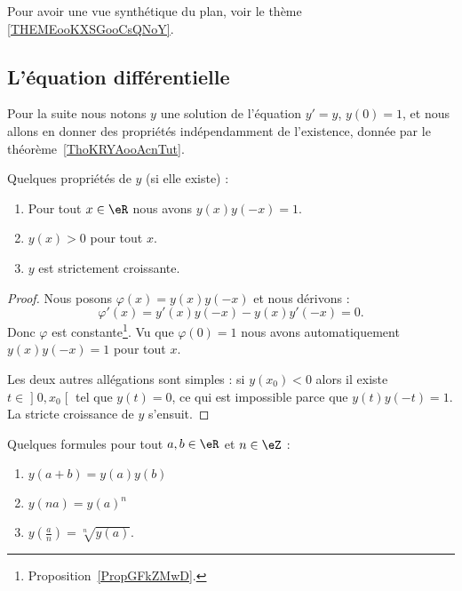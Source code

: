 Pour avoir une vue synthétique du plan, voir le thème \ref{THEMEooKXSGooCsQNoY}.

\subsection{L'équation différentielle}

Pour la suite nous notons \( y\) une solution de l'équation \( y'=y\), \( y(0)=1\), et nous allons en donner des propriétés indépendamment de l'existence, donnée par le théorème~\ref{ThoKRYAooAcnTut}.

\begin{proposition} \label{PropTLECooEiLbPP}
	Quelques propriétés de \( y\) (si elle existe) :
	\begin{enumerate}
		\item
		      Pour tout \( x\in \eR\) nous avons \( y(x)y(-x)=1\).
		\item
		      \( y(x)>0\) pour tout \( x\).
		\item
		      \( y\) est strictement croissante.
	\end{enumerate}
\end{proposition}

\begin{proof}
	Nous posons \( \varphi(x)=y(x)y(-x)\) et nous dérivons :
	\begin{equation}
		\varphi'(x)=y'(x)y(-x)-y(x)y'(-x)=0.
	\end{equation}
	Donc \( \varphi\) est constante\footnote{Proposition~\ref{PropGFkZMwD}.}. Vu que \( \varphi(0)=1\) nous avons automatiquement \( y(x)y(-x)=1\) pour tout \( x\).

	Les deux autres allégations sont simples : si \( y(x_0)<0\) alors il existe \( t\in\mathopen] 0 , x_0 \mathclose[\) tel que \( y(t)=0\), ce qui est impossible parce que \( y(t)y(-t)=1\). La stricte croissance de \( y\) s'ensuit.
\end{proof}

\begin{proposition}     \label{PROPooGGUIooExVHPM}
	Quelques formules pour tout \( a,b\in \eR\) et \( n\in \eZ\) :
	\begin{enumerate}
		\item       \label{ITEMooMPSUooWQpVQJ}
		      \( y(a+b)=y(a)y(b)\)
		\item
		      \( y(na)=y(a)^n\)
		\item
		      \( y\left( \frac{ a }{ n } \right)=\sqrt[n]{y(a)}\).
	\end{enumerate}
\end{proposition}

